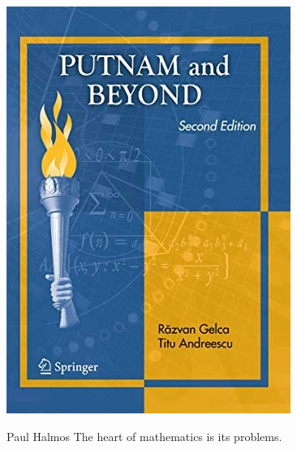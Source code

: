\begin{boxResource}[lefthand width=5cm, sidebyside]{}
\includegraphics[width=\textwidth]{./img/Gelca_Putnam}
\tcblower
\begin{boxQuote}{Paul Halmos}
The heart of mathematics is its problems.
\end{boxQuote}
\end{boxResource}
%

